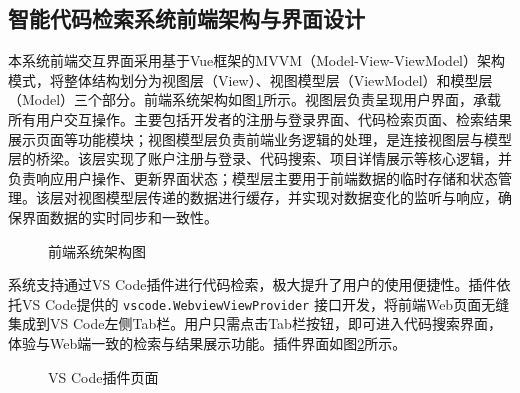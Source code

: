 \documentclass[UTF8,a4paper,12pt]{ctexart}
\numberwithin{equation}{section}
\begin{document}
\subsection{智能代码检索系统前端架构与界面设计}
本系统前端交互界面采用基于Vue框架的MVVM（Model-View-ViewModel）架构模式，将整体结构划分为视图层（View）、视图模型层（ViewModel）和模型层（Model）三个部分。前端系统架构如图\ref{front_model}所示。视图层负责呈现用户界面，承载所有用户交互操作。主要包括开发者的注册与登录界面、代码检索页面、检索结果展示页面等功能模块；视图模型层负责前端业务逻辑的处理，是连接视图层与模型层的桥梁。该层实现了账户注册与登录、代码搜索、项目详情展示等核心逻辑，并负责响应用户操作、更新界面状态；模型层主要用于前端数据的临时存储和状态管理。该层对视图模型层传递的数据进行缓存，并实现对数据变化的监听与响应，确保界面数据的实时同步和一致性。
\begin{figure}[H]
	\caption{前端系统架构图}
	\label{front_model}
\end{figure}
系统支持通过VS Code插件进行代码检索，极大提升了用户的使用便捷性。插件依托VS Code提供的 \texttt{vscode.WebviewViewProvider} 接口开发，将前端Web页面无缝集成到VS Code左侧Tab栏。用户只需点击Tab栏按钮，即可进入代码搜索界面，体验与Web端一致的检索与结果展示功能。插件界面如图\ref{vscode}所示。
\begin{figure}[H]
	\caption{VS Code插件页面}
	\label{vscode}
\end{figure}
\end{document}
